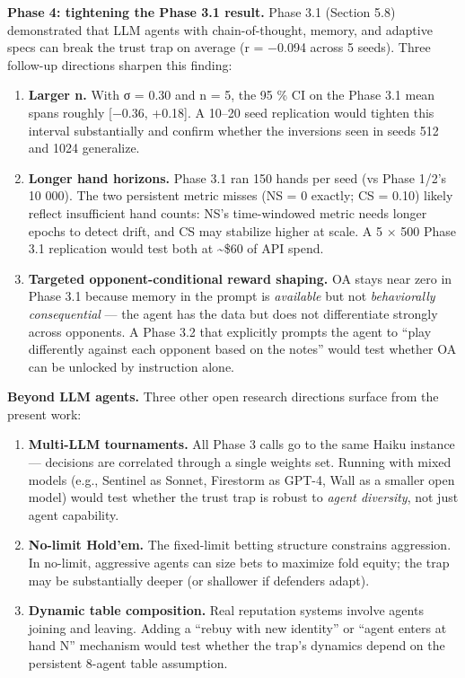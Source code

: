 \documentclass[
]{article}
\begin{document}
\textbf{Phase 4: tightening the Phase 3.1 result.} Phase 3.1 (Section
5.8) demonstrated that LLM agents with chain-of-thought, memory, and
adaptive specs can break the trust trap on average (r = −0.094 across 5
seeds). Three follow-up directions sharpen this finding:

\begin{enumerate}
\def\labelenumi{\arabic{enumi}.}
\item
  \textbf{Larger n.} With σ = 0.30 and n = 5, the 95 \% CI on the Phase
  3.1 mean spans roughly {[}−0.36, +0.18{]}. A 10--20 seed replication
  would tighten this interval substantially and confirm whether the
  inversions seen in seeds 512 and 1024 generalize.
\item
  \textbf{Longer hand horizons.} Phase 3.1 ran 150 hands per seed (vs
  Phase 1/2's 10 000). The two persistent metric misses (NS = 0 exactly;
  CS = 0.10) likely reflect insufficient hand counts: NS's time-windowed
  metric needs longer epochs to detect drift, and CS may stabilize
  higher at scale. A 5 × 500 Phase 3.1 replication would test both at
  \textasciitilde\$60 of API spend.
\item
  \textbf{Targeted opponent-conditional reward shaping.} OA stays near
  zero in Phase 3.1 because memory in the prompt is \emph{available} but
  not \emph{behaviorally consequential} --- the agent has the data but
  does not differentiate strongly across opponents. A Phase 3.2 that
  explicitly prompts the agent to ``play differently against each
  opponent based on the notes'' would test whether OA can be unlocked by
  instruction alone.
\end{enumerate}

\textbf{Beyond LLM agents.} Three other open research directions surface
from the present work:

\begin{enumerate}
\def\labelenumi{\arabic{enumi}.}
\item
  \textbf{Multi-LLM tournaments.} All Phase 3 calls go to the same Haiku
  instance --- decisions are correlated through a single weights set.
  Running with mixed models (e.g., Sentinel as Sonnet, Firestorm as
  GPT-4, Wall as a smaller open model) would test whether the trust trap
  is robust to \emph{agent diversity}, not just agent capability.
\item
  \textbf{No-limit Hold'em.} The fixed-limit betting structure
  constrains aggression. In no-limit, aggressive agents can size bets to
  maximize fold equity; the trap may be substantially deeper (or
  shallower if defenders adapt).
\item
  \textbf{Dynamic table composition.} Real reputation systems involve
  agents joining and leaving. Adding a ``rebuy with new identity'' or
  ``agent enters at hand N'' mechanism would test whether the trap's
  dynamics depend on the persistent 8-agent table assumption.
\end{enumerate}
\end{document}
